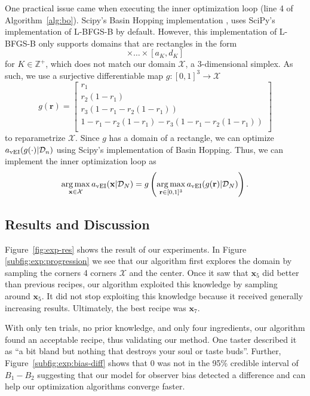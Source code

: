 One practical issue came when executing the inner optimization loop (line 4 of Algorithm~\ref{alg:bo}).
Scipy's Basin Hopping implementation \cite{scipy, wales1997}, uses SciPy's implementation of L-BFGS-B by default.
However, this implementation of L-BFGS-B only supports domains that are rectangles in the form
\begin{equation*}
    [a_1, d_1] \times \dots \times [a_K, d_K]
\end{equation*}
for $K \in \mathbb{Z}^{+}$,
which does not match our domain $\mathcal{X}$, a 3-dimensional simplex.
As such, we use a surjective differentiable map $g: [0, 1]^3 \to \mathcal{X}$
\begin{equation*}
    g(\mathbf{r}) =
    \begin{bmatrix}
        r_1 \\
        r_2(1 - r_1) \\
        r_3(1 - r_1 - r_2(1 - r_1)) \\
           1 - r_1 - r_2(1 - r_1) - r_3(1 - r_1 - r_2(1 - r_1)) \\
    \end{bmatrix}
\end{equation*}
to reparametrize $\mathcal{X}$.
Since $g$ has a domain of a rectangle, we can optimize $a_{\mathrm{vEI}}(g(\cdot) | \mathcal{D}_n)$ using Scipy's implementation of Basin Hopping.
Thus, we can implement the inner optimization loop as
\begin{equation*}
    \operatorname*{arg\,max}_{\mathbf{x} \in \mathcal{X}} a_{\mathrm{vEI}}(\mathbf{x} | \mathcal{D}_N)
    =
    g\left(\operatorname*{arg\,max}_{\mathbf{r} \in [0, 1]^3} a_{\mathrm{vEI}}(g(\mathbf{r}) | \mathcal{D}_N)\right).
\end{equation*}

\subsection{Results and Discussion}\label{ssec:results}

Figure~\ref{fig:exp-res} shows the result of our experiments.
In Figure \ref{subfig:exp:progression} we see that our algorithm first explores the domain by sampling the corners 4 corners $\mathcal{X}$ and the center.
Once it saw that $\mathbf{x}_5$ did better than previous recipes, our algorithm exploited this knowledge by sampling around $\mathbf{x}_5$.
It did not stop exploiting this knowledge because it received generally increasing results.
Ultimately, the best recipe was $\mathbf{x}_7$.

With only ten trials, no prior knowledge, and only four ingredients,
our algorithm found an acceptable recipe, thus validating our method.
One taster described it as ``a bit bland but nothing that destroys your soul or taste buds''.
Further, Figure~\ref{subfig:exp:bias-diff} shows that 0 was not in the 95\% credible interval of $B_1 - B_2$
suggesting that our model for observer bias detected a difference and can help our optimization algorithms converge faster.

